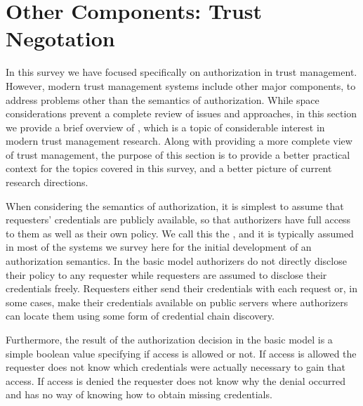 \section{Other Components: Trust Negotation}
\label{section-trust-negotiation}

In this survey we have focused specifically on authorization in trust
management.  However, modern trust management systems include other
major components, to address problems other than the semantics of
authorization.  While space considerations prevent a complete review
of issues and approaches, in this section we provide a brief overview
of , which is a topic of considerable interest
in modern trust management research.  Along with providing a more
complete view of trust management, the purpose of this section is to
provide a better practical context for the topics covered in this
survey, and a better picture of current research directions.

When considering the semantics of authorization, it is simplest to
assume that requesters' credentials are publicly available, so that
authorizers have full access to them as well as their own policy.  We
call this the , and it is typically assumed in most
of the systems we survey here for the initial development of an
authorization semantics.  In the basic model authorizers do not
directly disclose their policy to any requester while requesters are
assumed to disclose their credentials freely. Requesters either send
their credentials with each request or, in some cases, make their
credentials available on public servers where authorizers can locate
them using some form of credential chain discovery.

Furthermore, the result of the authorization decision in the basic
model is a simple boolean value specifying if access is allowed or
not. If access is allowed the requester does not know which
credentials were actually necessary to gain that access. If access is
denied the requester does not know why the denial occurred and has no
way of knowing how to obtain missing credentials.


